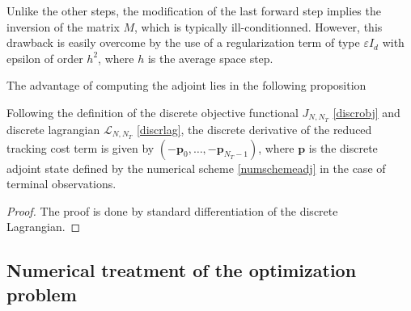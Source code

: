  \begin{remark}
  Unlike the other steps, the modification of the last forward step implies the inversion of the matrix $M$, which is typically ill-conditionned. However, this drawback is easily overcome by the use of a regularization term of type $\varepsilon I_d$ with epsilon of order $h^2$, where $h$ is the average space step.
 \end{remark}

 The advantage of computing the adjoint lies in the following proposition
 \begin{proposition}
 Following the definition of the discrete objective functional $J_{N,N_T}$ \eqref{discrobj} and discrete lagrangian $\mathcal{L}_{N,N_T}$ \eqref{discrlag}, the discrete derivative of the reduced tracking cost term is given by $\left(-\mathbf{p}_0,\ldots,-\mathbf{p}_{N_T-1}\right)$, where $\mathbf{p}$ is the discrete adjoint state defined by the numerical scheme \eqref{numschemeadj} in the case of terminal observations.
 \end{proposition}
\begin{proof}
 The proof is done by standard differentiation of the discrete Lagrangian.
\qquad\end{proof}

\subsection{Numerical treatment of the optimization problem}
